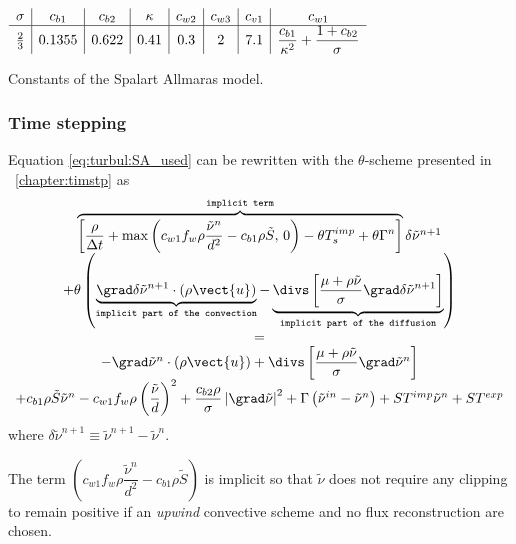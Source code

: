\begin{table}[!htbc]
\centering
$
\begin{array}{c | c | c | c | c | c | c | c }
\sigma      & c_{b1} & c_{b2} & \kappa & c_{w2} & c_{w3} & c_{v1} & c_{w1} \\
\hline
\frac{2}{3} & 0.1355 & 0.622  & 0.41   & 0.3    & 2      & 7.1    & \dfrac{c_{b1}}{ \kappa^2}+ \dfrac{1+c_{b2}}{ \sigma}  
\end{array}
$
\caption{Constants of the Spalart Allmaras model.\label{tab:const_SA}}
\end{table}

\subsubsection{Time stepping}

Equation \eqref{eq:turbul:SA_used} can be rewritten with the $\theta$-scheme presented in \chaptername~\ref{chapter:timstp} as
%
\begin{equation}\label{eq:turbul:SA_time}
\begin{array}{c}
\overbrace{
\left[ \dfrac{\rho}{\Delta t} + \max \left( c_{w1} f_{w} \rho  \dfrac{\tilde{\nu}^n}{d^2} - c_{b1}\rho \tilde{S} , \, 0 \right) - \theta T_s^{imp} + \theta \Gamma^n \right] 
}^{\texttt{implicit term}}
\delta \tilde{\nu}^{n+1}
%
\\
+ \theta
\left(
\underbrace{
 \grad \delta \tilde{\nu}^{n+1} \cdot \left( \rho \vect{u} \right) 
}_{
\texttt{implicit part of the convection}
}
- 
\underbrace{
\divs \left[ \dfrac{\mu + \rho \tilde{\nu}}{\sigma} \grad \delta \tilde{\nu}^{n+1} \right] 
}_{
\texttt{implicit part of the diffusion}
}
\right) 
\\
= 
\\
- \grad \tilde{\nu}^{n} \cdot \left( \rho \vect{u} \right) 
+ 
\divs \left[ \dfrac{\mu + \rho \tilde{\nu}}{\sigma} \grad \tilde{\nu}^{n} \right] 
\\
+
c_{b1} \rho \tilde{S} \tilde{\nu}^n
- c_{w1}f_{w}\rho \left( \dfrac{\tilde{\nu}}{d} \right)^2
+ \dfrac{c_{b2}\rho}{ \sigma} 
 \left| \grad \tilde{\nu} \right| ^2 
 + \Gamma \left( \tilde{\nu}^{in} - \tilde{\nu}^n \right) +ST^{imp} \tilde{\nu}^n +ST^{exp}
\end{array}
\end{equation}
where $\delta \tilde{\nu}^{n+1} \equiv \tilde{\nu}^{n+1} - \tilde{\nu}^{n}$.

\begin{remark}
The term $\left( c_{w1} f_{w} \rho  \dfrac{\tilde{\nu}^n}{d^2} - c_{b1}\rho \tilde{S} \right)$ is implicit 
so that $\tilde{\nu} $ does not require any clipping to remain positive if an \emph{upwind} convective scheme and no flux 
reconstruction are chosen.
\end{remark}


